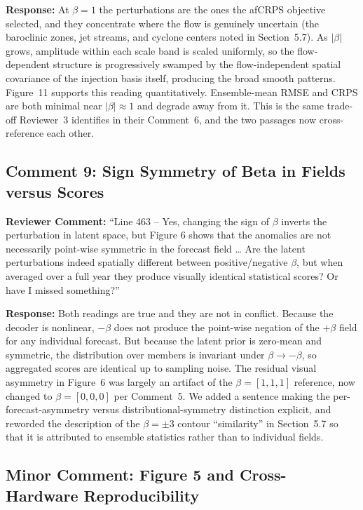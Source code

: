 \documentclass[12pt]{article}
\begin{document}
\textbf{Response:} At $\beta=1$ the perturbations are the ones the afCRPS objective selected, and they
concentrate where the flow is genuinely uncertain (the baroclinic zones, jet
streams, and cyclone centers noted in Section~5.7). As $|\beta|$ grows, amplitude
within each scale band is scaled uniformly, so the flow-dependent structure is
progressively swamped by the flow-independent spatial covariance of the injection
basis itself, producing the broad smooth patterns. Figure~11 supports this reading
quantitatively. Ensemble-mean RMSE and CRPS are both minimal near $|\beta|\approx1$
and degrade away from it. This is the same trade-off Reviewer~3 identifies in their
Comment~6, and the two passages now cross-reference each other.

\subsection*{Comment 9: Sign Symmetry of Beta in Fields versus Scores}

\textbf{Reviewer Comment:} ``Line 463 -- Yes, changing the sign of $\beta$ inverts
the perturbation in latent space, but Figure 6 shows that the anomalies are not
necessarily point-wise symmetric in the forecast field \ldots{} Are the latent
perturbations indeed spatially different between positive/negative $\beta$, but when
averaged over a full year they produce visually identical statistical scores? Or have
I missed something?''

\textbf{Response:} Both readings are true and they are not in conflict. Because the decoder is
nonlinear, $-\beta$ does not produce the point-wise negation of the $+\beta$ field for
any individual forecast. But because the latent prior is zero-mean and symmetric, the
distribution over members is invariant under $\beta\to-\beta$, so aggregated scores
are identical up to sampling noise. The residual visual asymmetry in Figure~6 was
largely an artifact of the $\beta=[1,1,1]$ reference, now changed to $\beta=[0,0,0]$
per Comment~5. We added a sentence making the per-forecast-asymmetry versus
distributional-symmetry distinction explicit, and reworded the description of the
$\beta=\pm3$ contour ``similarity'' in Section~5.7 so that it is attributed to
ensemble statistics rather than to individual fields.

\subsection*{Minor Comment: Figure 5 and Cross-Hardware Reproducibility}
\end{document}
